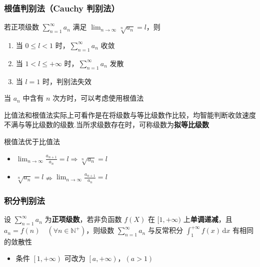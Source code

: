 \documentclass[lang = zh , final , oneside , openany , titlepage , zihao = -4 , linespread = 1.3 , baselineskip = false , cjk-font = windows , text-font = newtx , math-font = newtx]{sjtureport}
\begin{document}
\subsubsection{根值判别法（Cauchy 判别法）}

\begin{theorem}
若正项级数 \(\displaystyle \sum_{n=1}^\infty a_n\) 满足
\(\displaystyle \lim_{n\to\infty} \sqrt[n]{a_n} = l\)，则

\begin{enumerate}
\def\labelenumi{\arabic{enumi}.}
\item
  当 \(0\leq l<1\) 时，\(\displaystyle \sum_{n=1}^\infty a_n\) 收敛
\item
  当 \(1 < l \leq +\infty\) 时，\(\displaystyle \sum_{n=1}^\infty a_n\)
  发散
\item
  当 \(l=1\) 时，判别法失效
\end{enumerate}
\end{theorem}

\begin{remark}
    当 \(a_n\) 中含有 \(n\) 次方时，可以考虑使用根值法
\end{remark}

\begin{remark}
    比值法和根值法实际上可看作是在将级数与等比级数作比较，均智能判断收敛速度不满与等比级数的级数.当所求级数存在时，可称级数为\textbf{拟等比级数}
\end{remark}

\begin{remark}
    根值法优于比值法
    \begin{itemize}
\item
  \(\displaystyle\lim_{n\to\infty}\frac{a_{n+1}}{a_n} =  l \Rightarrow \displaystyle \sqrt[n]{a_n} = l\)
\item
  \(\displaystyle \sqrt[n]{a_n} =l \nRightarrow \displaystyle\lim_{n\to\infty}\frac{a_{n+1}}{a_n} =  l\)
\end{itemize}
\end{remark}

\subsubsection{积分判别法}

\begin{definition}
    设 \(\displaystyle \sum_{n=1}^\infty a_n\)
为\textbf{正项级数}，若非负函数 \(f(X)\) 在 \([1,+\infty)\)
上\textbf{单调递减}，且
\(a_n = f(n)\quad \left(\forall n \in \mathbb{N}^+\right)\)，则级数
\(\displaystyle \sum_{n=1}^\infty a_n\) 与反常积分
\(\displaystyle \int_1^{+\infty} f(x)\,\mathrm{d}x\) 有相同的敛散性

\begin{itemize}
\item
  条件 \(\left[1,+\infty\right)\) 可改为
  \(\left[a,+\infty\right)，(a>1)\)
\end{itemize}
\end{definition}
\end{document}
